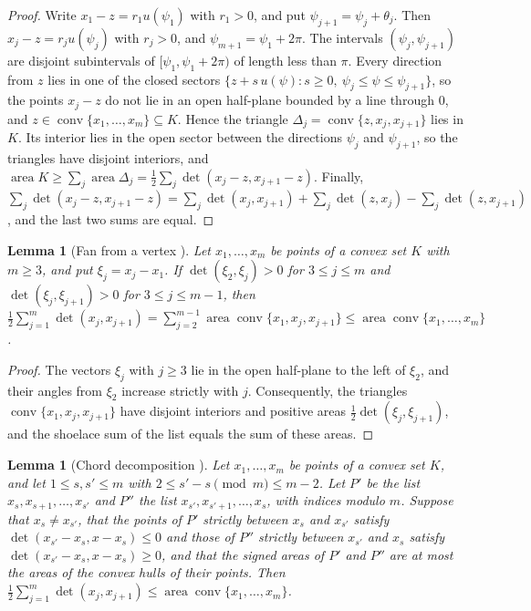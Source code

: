 \documentclass[11pt]{amsart}
\newtheorem{lemma}[theorem]{Lemma}
\theoremstyle{definition}
\theoremstyle{remark}
\numberwithin{equation}{section}
\newcommand{\area}{\operatorname{area}}
\newcommand{\conv}{\operatorname{conv}}
\begin{document}
\begin{proof}
Write $x_1-z=r_1u(\psi_1)$ with $r_1>0$, and put $\psi_{j+1}=\psi_j+\theta_j$. Then $x_j-z=r_ju(\psi_j)$ with $r_j>0$, and $\psi_{m+1}=\psi_1+2\pi$. The intervals $(\psi_j,\psi_{j+1})$ are disjoint subintervals of $[\psi_1,\psi_1+2\pi)$ of length less than $\pi$. Every direction from $z$ lies in one of the closed sectors $\{z+s\,u(\psi):s\ge0,\ \psi_j\le\psi\le\psi_{j+1}\}$, so the points $x_j-z$ do not lie in an open half-plane bounded by a line through $0$, and $z\in\conv\{x_1,\dots,x_m\}\subseteq K$. Hence the triangle $\Delta_j=\conv\{z,x_j,x_{j+1}\}$ lies in $K$. Its interior lies in the open sector between the directions $\psi_j$ and $\psi_{j+1}$, so the triangles have disjoint interiors, and $\area K\ge\sum_j\area\Delta_j=\frac12\sum_j\det(x_j-z,x_{j+1}-z)$. Finally, $\sum_j\det(x_j-z,x_{j+1}-z)=\sum_j\det(x_j,x_{j+1})+\sum_j\det(z,x_j)-\sum_j\det(z,x_{j+1})$, and the last two sums are equal.
\end{proof}

\begin{lemma}[Fan from a vertex {\cite[Lemma~3.4]{Kel26}}]\label{lem:vfan}
Let $x_1,\dots,x_m$ be points of a convex set $K$ with $m\ge3$, and put $\xi_j=x_j-x_1$. If $\det(\xi_2,\xi_j)>0$ for $3\le j\le m$ and $\det(\xi_j,\xi_{j+1})>0$ for $3\le j\le m-1$, then $\frac12\sum_{j=1}^m\det(x_j,x_{j+1})=\sum_{j=2}^{m-1}\area\conv\{x_1,x_j,x_{j+1}\}\le\area\conv\{x_1,\dots,x_m\}$.
\end{lemma}

\begin{proof}
The vectors $\xi_j$ with $j\ge3$ lie in the open half-plane to the left of $\xi_2$, and their angles from $\xi_2$ increase strictly with $j$. Consequently, the triangles $\conv\{x_1,x_j,x_{j+1}\}$ have disjoint interiors and positive areas $\frac12\det(\xi_j,\xi_{j+1})$, and the shoelace sum of the list equals the sum of these areas.
\end{proof}

\begin{lemma}[Chord decomposition {\cite[Lemma~3.5]{Kel26}}]\label{lem:chord}
Let $x_1,\dots,x_m$ be points of a convex set $K$, and let $1\le s,s'\le m$ with $2\le s'-s\pmod m\le m-2$. Let $P'$ be the list $x_s,x_{s+1},\dots,x_{s'}$ and $P''$ the list $x_{s'},x_{s'+1},\dots,x_s$, with indices modulo $m$. Suppose that $x_s\ne x_{s'}$, that the points of $P'$ strictly between $x_s$ and $x_{s'}$ satisfy $\det(x_{s'}-x_s,x-x_s)\le0$ and those of $P''$ strictly between $x_{s'}$ and $x_s$ satisfy $\det(x_{s'}-x_s,x-x_s)\ge0$, and that the signed areas of $P'$ and $P''$ are at most the areas of the convex hulls of their points. Then $\frac12\sum_{j=1}^m\det(x_j,x_{j+1})\le\area\conv\{x_1,\dots,x_m\}$.
\end{lemma}
\end{document}
